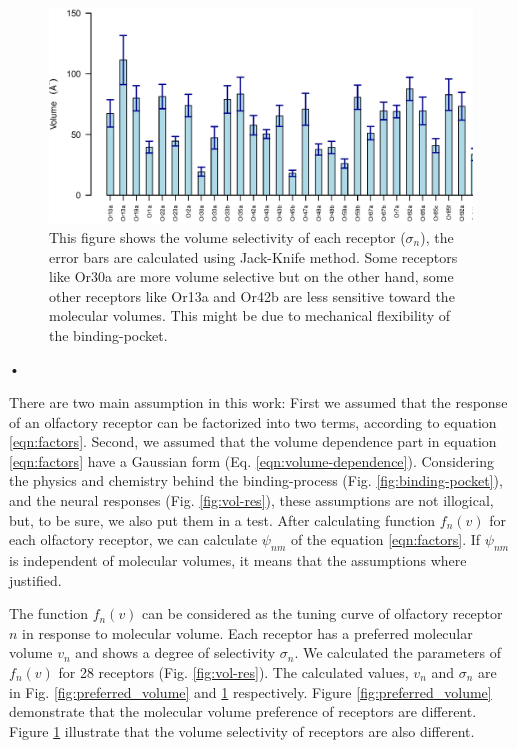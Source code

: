 \documentclass[11pt]{paper} %
\newcommand{\numberofreceptors}{28 }
\begin{document}
\begin{figure}
	\includegraphics[width=\textwidth]{fig/std-vol}
	\caption{This figure shows the volume selectivity of each receptor ($\sigma_n$), the error bars are calculated using Jack-Knife method.
	Some receptors like Or30a are more volume selective but on the other hand, some other receptors like Or13a and Or42b are less sensitive toward the molecular volumes.
	This might be due to mechanical flexibility of the binding-pocket.}
	\label{fig:volume_selectivity}
\end{figure}•

There are two main assumption in this work: 
First we assumed that the response of an olfactory receptor can be factorized into two terms, 
according to equation \ref{eqn:factors}.
Second, we assumed that the volume dependence part in equation \ref{eqn:factors} 
have a Gaussian form (Eq. \ref{eqn:volume-dependence}).
Considering the physics and chemistry behind the binding-process (Fig. \ref{fig:binding-pocket}), 
and the neural responses (Fig. \ref{fig:vol-res}), these assumptions are not illogical, 
but, to be sure, we also put them in a test. 
After calculating function $f_n(v)$ for each olfactory receptor, we can calculate $\psi_{nm}$ of the equation \ref{eqn:factors}.
If $\psi_{nm}$ is independent of molecular volumes, it means that the assumptions where justified.

The function $f_n(v)$ can be considered as the tuning curve of olfactory receptor $n$ in response to molecular volume. 
Each receptor has a preferred molecular volume $v_n$ and shows a degree of selectivity $\sigma_n$. 
We calculated the parameters of $f_n(v)$ for \numberofreceptors receptors (Fig. \ref{fig:vol-res}). 
The calculated values, $v_n$ and $\sigma_n$ are in Fig. \ref{fig:preferred_volume} and \ref{fig:volume_selectivity} respectively.
Figure \ref{fig:preferred_volume} demonstrate that the molecular volume preference of receptors are different. 
Figure \ref{fig:volume_selectivity} illustrate that the volume selectivity of receptors are also different.
\end{document}
